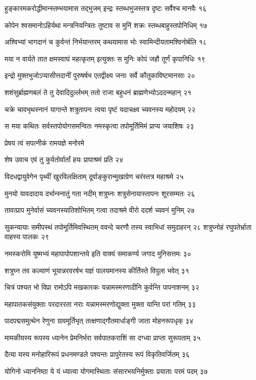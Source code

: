 हुङ्कारमकरोद्धीमान्स्तम्भयामास तद्भुजम्
इन्द्रः स्तब्धभुजस्तत्र दृष्टः सर्वैश्च मानवैः १६

कोपेन श्वसमानोऽहिर्यथा मन्त्रनियन्त्रितः
तुष्टाव स मुनिं शक्रः स्तब्धबाहुस्तपोनिधिम् १७

अश्विभ्यां भागदानं च कुर्वन्तं निर्भयान्तरम्
कथयामास भोः स्वामिन्दीयतामश्विनोर्बलि १८

मया न वार्यते तात क्षमस्वाघं महत्कृतम्
इत्युक्तः स मुनिः कोपं जहौ तूर्णं कृपानिधिः १९

इन्द्रो मुक्तभुजोऽप्यासीत्तदानीं पुरुषर्षभ
एतद्वीक्ष्य जनाः सर्वे कौतुकाविष्टमानसाः २०

शशंसुर्ब्राह्मणबलं ते तु देवादिदुर्ल्लभम्
ततो राजा बहुधनं ब्राह्मणेभ्योऽददन्महान् २१

चक्रे चावभृथस्नानं यागान्ते शत्रुतापनः
त्वया पृष्टं यदाचक्ष्व च्यवनस्य महोदयम् २२

स मया कथितः सर्वस्तपोयोगसमन्वितः
नमस्कृत्वा तपोमूर्तिमिमं प्राप्य जयाशिषः २३

प्रेषय त्वं सपत्नीकं रामयज्ञे मनोरमे

शेष उवाच
एवं तु कुर्वतोर्वार्तां हयः प्रापाश्रमं प्रति २४

विदधद्वायुवेगेन पृथ्वीं खुरविलक्षिताम्
दूर्वाङ्कुरान्मुखाग्रेण चरंस्तत्र महाश्रमे २५

मुनयो यावदादाय दर्भान्स्नातुं गता नदीम्
शत्रुघ्नः शत्रुसेनायास्तापनः शूरसम्मतः २६

तावत्प्राप मुनेर्वासं च्यवनस्यातिशोभितम्
गत्वा तदाश्रमे वीरो ददर्श च्यवनं मुनिम् २७

सुकन्यायाः समीपस्थं तपोमूर्तिमिवस्थितम्
ववन्दे चरणौ तस्य स्वाभिधां समुदाहरन् २८
शत्रुघ्नोहं रघुपतेर्भ्राता वाहस्य पालकः २९

नमस्करोमि युष्मभ्यं महापापोपशान्तये
इति वाक्यं समाकर्ण्य जगाद मुनिसत्तमः ३०

शत्रुघ्न तव कल्याणं भूयान्नरवरर्षभ
यज्ञं पालयमानस्य कीर्तिस्ते विपुला भवेत् ३१

चित्रं पश्यत भो विप्रा रामोऽपि मखकारकः
यन्नामस्मरणादीनि कुर्वन्ति पापनाशनम् ३२

महापातकसंयुक्ताः परदाररता नराः
यन्नामस्मरणोद्युक्ता मुक्ता यान्ति परां गतिम् ३३

पादपद्मसमुत्थेन रेणुना ग्रावमूर्तिभृत्
तत्क्षणाद्गौतमार्धाङ्गी जाता मोहनरूपधृक् ३४

मामकीयस्य रूपस्य ध्यानेन प्रेमनिर्भरा
सर्वपातकराशिं सा दग्ध्वा प्राप्ता सुरूपताम् ३५

दैत्या यस्य मनोहारिरूपं प्रधनमण्डले
पश्यन्तः प्रापुरेतस्य रूपं विकृतिवर्जितम् ३६

योगिनो ध्याननिष्ठा ये यं ध्यात्वा योगमास्थिताः
संसारभयनिर्मुक्ताः प्रयाताः परमं पदम् ३७

